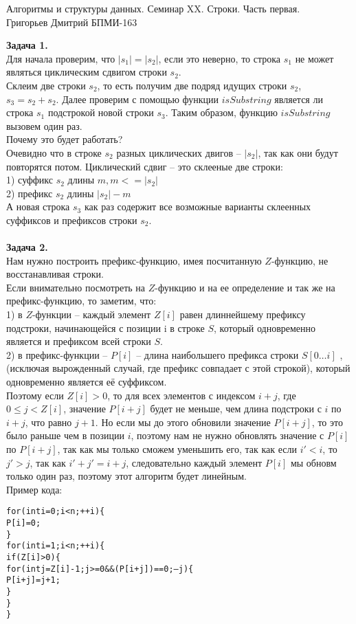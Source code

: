 \documentclass[12pt,a4paper]{scrartcl}
\begin{document}
	\begin{center}	
		Алгоритмы и структуры данных. Семинар XX.
		Строки. Часть первая. \\
		Григорьев Дмитрий БПМИ-163\\
	\end{center}
	\textbf{Задача 1.} \\
	
	Для начала проверим, что $|s_1| = |s_2|$, если это неверно, то строка $s_1$ не может являться циклическим сдвигом строки $s_2$.\\
	Склеим две строки $s_2$, то есть получим две подряд идущих строки $s_2$, $s_3 = s_2 + s_2$. Далее проверим с помощью функции $isSubstring$ является ли строка $s_1$ подстрокой новой строки $s_3$. Таким образом, функцию $isSubstring$ вызовем один раз.\\
	Почему это будет работать?\\
	Очевидно что в строке $s_2$ разных циклических двигов -- $|s_2|$, так как они будут повторятся потом. Циклический сдвиг -- это склееные две строки: \\
	 1) суффикс $s_2$ длины $m, m <= |s_2|$ \\
	 2) префикс $s_2$ длины $|s_2| - m$\\
	 А новая строка $s_3$ как раз содержит все возможные варианты склеенных суффиксов и префиксов строки $s_2$.\\
	 \\
	\textbf{Задача 2.} \\
	
	Нам нужно построить префикс-функцию, имея посчитанную $Z$-функцию, не восстанавливая строки.\\
	Если внимательно посмотреть на $Z$-функцию и на ее определение и так же на префикс-функцию, то заметим, что:\\
	1) в $Z$-функции -- каждый элемент $Z[i]$ равен длиннейшему префиксу подстроки, начинающейся с позиции i в строке $S$, который одновременно является и префиксом всей строки $S$.\\
	2) в префикс-функции -- $P[i]$ -- длина наибольшего префикса строки $S[0\ldots i]$ , (исключая вырожденный случай, где префикс совпадает с этой строкой), который одновременно является её суффиксом. \\
	Поэтому если $Z[i] > 0$, то для всех элементов с индексом $i + j$, где $0 \leq j < Z[i]$, значение $P[i + j]$ будет не меньше, чем длина подстроки с $i$ по $i + j$, что равно $j + 1$. Но если мы до этого обновили значение $P[i + j]$, то это было раньше чем в позиции $i$, поэтому нам не нужно обновлять значение с $P[i]$ по $P[i + j]$, так как мы только сможем уменьшить его, так как если $i' < i$, то $j' > j$, так как $i' + j' = i + j$, следовательно каждый элемент $P[i]$ мы обновм только один раз, поэтому этот алгоритм будет линейным. \\
	\newpage
	Пример кода:
	\begin{alltt}
	for (int i = 0; i < n; ++i) \{
	   P[i] = 0;
	\}
	for(int i = 1; i < n; ++i) \{
	   if (Z[i] > 0) \{
	      for(int j = Z[i] - 1; j >= 0 && (P[i + j]) == 0; --j) \{
	         P[i + j] = j + 1;
	      \}
	   \}
	\}
	\end{alltt}
\end{document}
